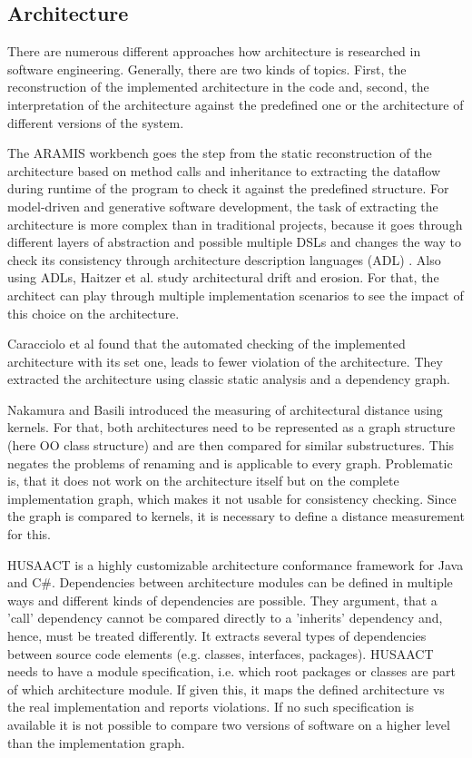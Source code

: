 \documentclass[conference]{IEEEtran}
\begin{document}
\subsection{Architecture}


There are numerous different approaches how architecture is researched in software engineering. Generally, there are two kinds of topics. First, the reconstruction of the implemented architecture in the code and, second, the interpretation of the architecture against the predefined one or the architecture of different versions of the system.

The ARAMIS workbench \cite{Aramis} goes the step from the static reconstruction of the architecture based on method calls and inheritance to extracting the dataflow during runtime of the program to check it against the predefined structure. 
For model-driven and generative software development, the task of extracting the architecture is more complex than in traditional projects, because it goes through different layers of abstraction and possible multiple DSLs and changes the way to check its consistency through architecture description languages (ADL) \cite{ArcCons,Arc-MDSE}. Also using ADLs, Haitzer et al. \cite{Arc-Decision} study architectural drift and erosion. For that, the architect can play through multiple implementation scenarios to see the impact of this choice on the architecture.

Caracciolo et al \cite{ArcConf} found that the automated checking of the implemented architecture with its set one, leads to fewer violation of the architecture. They extracted the architecture using classic static analysis and a dependency graph.  

Nakamura and Basili \cite{StructDist} introduced the measuring of architectural distance using kernels. For that, both architectures need to be represented as a graph structure (here OO class structure) and are then compared for similar substructures. This negates the problems of renaming and is applicable to every graph. Problematic is, that it does not work on the architecture itself but on the complete implementation graph, which makes it not usable for consistency checking. Since the graph is compared to kernels, it is necessary to define a distance measurement for this.

HUSAACT \cite{Husacct1,Husacct2} is a highly customizable architecture conformance framework for Java and C\#. Dependencies between architecture modules can be defined in multiple ways and different kinds of dependencies are possible. They argument, that a 'call' dependency cannot be compared directly to a 'inherits' dependency and, hence, must be treated differently. 
It extracts several types of dependencies between source code elements (e.g. classes, interfaces, packages). HUSAACT needs to have a module specification, i.e. which root packages or classes are part of which architecture module. If given this, it maps the defined architecture vs the real implementation and reports violations.
If no such specification is available it is not possible to compare two versions of software on a higher level than the implementation graph. 
\end{document}
